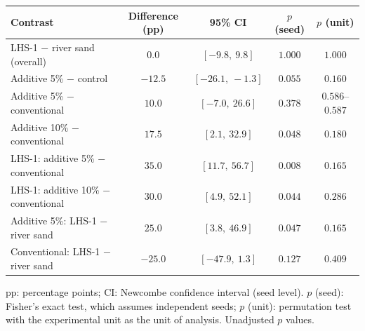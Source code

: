 \begin{tabular}{lcccc}
\hline\hline
\textbf{Contrast} & \textbf{Difference (pp)} & \textbf{95\% CI} & \textbf{$p$ (seed)} & \textbf{$p$ (unit)} \\
\hline
LHS-1 $-$ river sand (overall) & $0.0$ & $[-9.8,\ 9.8]$ & $1.000$ & $1.000$ \\
Additive 5\% $-$ control & $-12.5$ & $[-26.1,\ -1.3]$ & $0.055$ & $0.160$ \\
Additive 5\% $-$ conventional & $10.0$ & $[-7.0,\ 26.6]$ & $0.378$ & $0.586$--$0.587$ \\
Additive 10\% $-$ conventional & $17.5$ & $[2.1,\ 32.9]$ & $0.048$ & $0.180$ \\
LHS-1: additive 5\% $-$ conventional & $35.0$ & $[11.7,\ 56.7]$ & $0.008$ & $0.165$ \\
LHS-1: additive 10\% $-$ conventional & $30.0$ & $[4.9,\ 52.1]$ & $0.044$ & $0.286$ \\
Additive 5\%: LHS-1 $-$ river sand & $25.0$ & $[3.8,\ 46.9]$ & $0.047$ & $0.165$ \\
Conventional: LHS-1 $-$ river sand & $-25.0$ & $[-47.9,\ 1.3]$ & $0.127$ & $0.409$ \\
\hline
\end{tabular}
\par\vspace{4pt}
\parbox{0.94\linewidth}{\footnotesize pp: percentage points; CI: Newcombe confidence interval (seed level). $p$ (seed): Fisher's exact test, which assumes independent seeds; $p$ (unit): permutation test with the experimental unit as the unit of analysis. Unadjusted $p$ values.}

